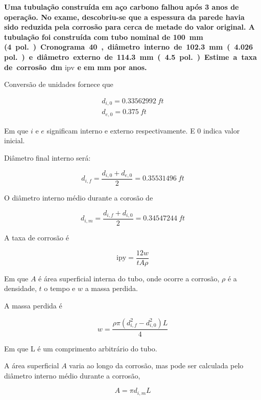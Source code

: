 \documentclass{article}
\begin{document}
\textbf{Uma tubulação construída em aço carbono falhou após 3 anos de operação. No exame, descobriu-se que a espessura da parede havia sido reduzida pela corrosão para cerca de metade do valor original. A tubulação foi construída com tubo nominal de \SI{100}{mm} (\SI{4}{pol.}) Cronograma 40, diâmetro interno de \SI{102.3}{mm} (\SI{4.026}{pol.}) e diâmetro externo de \SI{114.3}{mm} (\SI{4.5}{pol.}). Estime a taxa de corrosão dm $\mathrm{ipv}$ e em \si{mm} por anos.}

Conversão de unidades fornece que

\begin{align}
  d_{i,0} = \SI{0.33562992}{ft} \\
  d_{e,0} = \SI{0.375}{ft}
\end{align}

Em que $i$ e $e$ significam interno e externo respectivamente. E $0$ indica valor inicial.

Diâmetro final interno será:

\begin{equation}
  d_{i,f} = \frac{d_{i,0}+d_{e,0}}{2} = \SI{0.35531496}{ft}
\end{equation}

O diâmetro interno médio durante a corosão de

\begin{equation}
  d_{i,m} = \frac{ d_{i,f} + d_{i,0} }{2} = \SI{0.34547244}{ft}
\end{equation}

A taxa de corrosão é

\begin{equation}
  \mathrm{ipy} = \frac{12 w}{t A \rho}
\end{equation}

Em que $A$ é área superficial interna do tubo, onde ocorre a corrosão, $\rho$ é a densidade, $t$ o tempo e $w$ a massa perdida.

A massa perdida é

\begin{equation}
  w = \frac{\rho \pi (d_{i,f}^2 - d_{i,0}^2) L}{4}
\end{equation}

Em que L é um comprimento arbitrário do tubo.

A área superficial $A$ varia ao longo da corrosão, mas pode ser calculada pelo diâmetro interno médio durante a corrosão,

\begin{equation}
  A = \pi d_{i,m} L
\end{equation}
\end{document}
